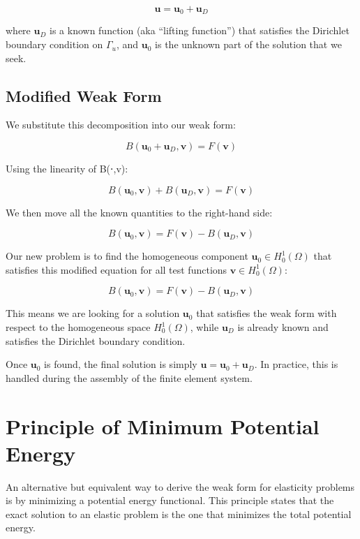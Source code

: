 \documentclass[
  11pt,
  a4paper,
]{scrbook}
\begin{document}
\[\mathbf{u} = \mathbf{u}_0 + \mathbf{u}_D\]

where \(\boldsymbol{u}_D\) is a known function (aka ``lifting
function'') that satisfies the Dirichlet boundary condition on
\(\Gamma_u\), and \(\boldsymbol{u}_0\) is the unknown part of the
solution that we seek.

\subsection{Modified Weak Form}\label{modified-weak-form}

We substitute this decomposition into our weak form:

\[B(\mathbf{u}_0 + \mathbf{u}_D, \mathbf{v}) = F(\mathbf{v})\]

Using the linearity of B(⋅,v):

\[B(\mathbf{u}_0, \mathbf{v}) + B(\mathbf{u}_D, \mathbf{v}) = F(\mathbf{v})\]

We then move all the known quantities to the right-hand side:

\[B(\mathbf{u}_0, \mathbf{v}) = F(\mathbf{v}) - B(\mathbf{u}_D, \mathbf{v})\]

Our new problem is to find the homogeneous component
\(\boldsymbol{u}_0 \in H^1_0(\Omega)\) that satisfies this modified
equation for all test functions \(\boldsymbol{v} \in H^1_0(\Omega)\):

\[B(\mathbf{u}_0, \mathbf{v}) = F(\mathbf{v}) - B(\mathbf{u}_D, \mathbf{v})\]

This means we are looking for a solution \(\boldsymbol{u}_0\) that
satisfies the weak form with respect to the homogeneous space
\(H^1_0(\Omega)\), while \(\boldsymbol{u}_D\) is already known and
satisfies the Dirichlet boundary condition.

Once \(\boldsymbol{u}_0\) is found, the final solution is simply
\(\boldsymbol{u} = \boldsymbol{u}_0 + \boldsymbol{u}_D\). In practice,
this is handled during the assembly of the finite element system.

\section{Principle of Minimum Potential
Energy}\label{principle-of-minimum-potential-energy}

An alternative but equivalent way to derive the weak form for elasticity
problems is by minimizing a potential energy functional. This principle
states that the exact solution to an elastic problem is the one that
minimizes the total potential energy.
\end{document}
